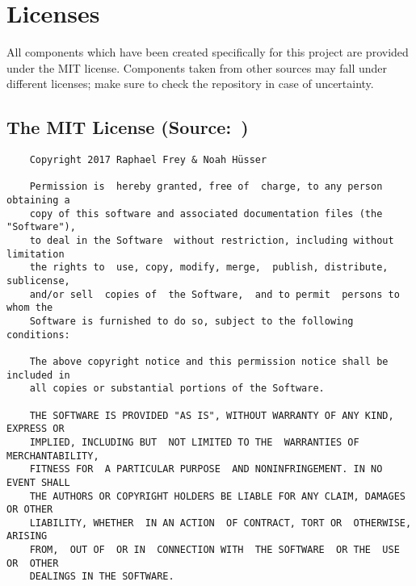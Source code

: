%
%
\chapter{Licenses} %
\label{ch:app:licenses}

All  components which  have been  created  specifically for  this project  are
provided under the  MIT license. Components taken from other  sources may fall
under  different licenses;  make  sure  to check  the  repository  in case  of
uncertainty.

\section[The MIT License]{The MIT License (Source:~\cite{licenses:mit})} %
\label{sec:mit_license}

\begin{tcolorbox}
    \begin{verbatim}
    Copyright 2017 Raphael Frey & Noah Hüsser

    Permission is  hereby granted, free of  charge, to any person  obtaining a
    copy of this software and associated documentation files (the "Software"),
    to deal in the Software  without restriction, including without limitation
    the rights to  use, copy, modify, merge,  publish, distribute, sublicense,
    and/or sell  copies of  the Software,  and to permit  persons to  whom the
    Software is furnished to do so, subject to the following conditions:

    The above copyright notice and this permission notice shall be included in
    all copies or substantial portions of the Software.

    THE SOFTWARE IS PROVIDED "AS IS", WITHOUT WARRANTY OF ANY KIND, EXPRESS OR
    IMPLIED, INCLUDING BUT  NOT LIMITED TO THE  WARRANTIES OF MERCHANTABILITY,
    FITNESS FOR  A PARTICULAR PURPOSE  AND NONINFRINGEMENT. IN NO  EVENT SHALL
    THE AUTHORS OR COPYRIGHT HOLDERS BE LIABLE FOR ANY CLAIM, DAMAGES OR OTHER
    LIABILITY, WHETHER  IN AN ACTION  OF CONTRACT, TORT OR  OTHERWISE, ARISING
    FROM,  OUT OF  OR IN  CONNECTION WITH  THE SOFTWARE  OR THE  USE OR  OTHER
    DEALINGS IN THE SOFTWARE.
    \end{verbatim}
\end{tcolorbox}

